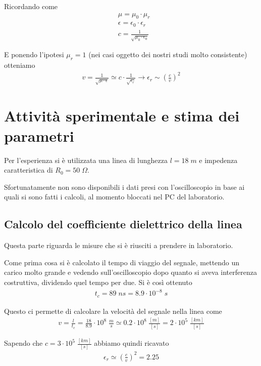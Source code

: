 \documentclass[]{report}
\begin{document}
Ricordando come
\begin{align}
&\mu = \mu_0 \cdot \mu_r\\
&\epsilon = \epsilon_0 \cdot \epsilon_r\\
&c= \frac{1}{\sqrt{\mu_0 \cdot \epsilon_0}}
\end{align}

E ponendo l'ipotesi $\mu_r=1$ (nei casi oggetto dei nostri studi molto consistente) otteniamo
\begin{align}
v = \frac{1}{\sqrt{\mu \cdot \epsilon}} \simeq c \cdot \frac{1}{\sqrt{\epsilon_r}} \rightarrow \epsilon_r \sim \left(\frac{c}{v} \right)^2
\end{align}

\newpage

\section{Attività sperimentale e stima dei parametri}

Per l'esperienza si è utilizzata una linea di lunghezza $l= 18 \; m$ e impedenza caratteristica di $R_0= 50 \; \Omega$.

Sfortunatamente non sono disponibili i dati presi con l'oscilloscopio in base ai quali si sono fatti i calcoli, al momento bloccati nel PC del laboratorio.

\subsection{Calcolo del coefficiente dielettrico della linea}

Questa parte riguarda le misure che si è riusciti a prendere in laboratorio.

Come prima cosa si è calcolato il tempo di viaggio del segnale, mettendo un carico molto grande e vedendo sull'oscilloscopio dopo quanto si aveva interferenza costruttiva, dividendo quel tempo per due. Si è così ottenuto
\begin{align}
t_c = 89 \; ns = 8.9 \cdot 10^{-8} \; s
\end{align}

Questo ci permette di calcolare la velocità del segnale nella linea come
\begin{align}
v = \frac{l}{t_c} = \frac{18}{8.9} \cdot  10^{8} \; \frac{m}{s} \simeq 0.2 \cdot 10^{8} \; \frac{[m]}{[s]} = 2 \cdot 10^5 \; \frac{[km]}{[s]}
\end{align}

Sapendo che $c = 3 \cdot 10^5 \; \frac{[km]}{[s]}$ abbiamo quindi ricavato
\begin{align}
\epsilon_r \simeq \left(\frac{c}{v}\right) ^2 = 2.25
\end{align}
\end{document}
